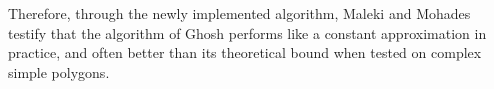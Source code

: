 Therefore, through the newly implemented algorithm, Maleki and Mohades \cite{maleki2022implementation} testify that the algorithm of Ghosh \cite{GHOSH2010718} performs like a constant approximation in practice, and often better than its theoretical bound when tested on complex simple polygons.
